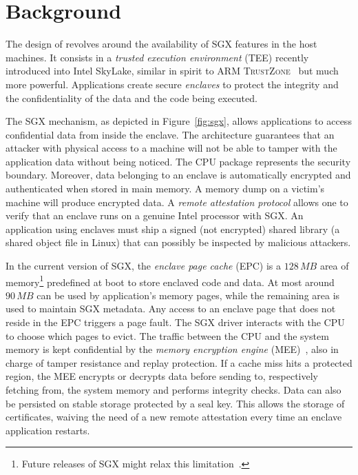 
\chapter{Background}
\label{chap:background}

The design of \SS{} revolves around the availability of SGX features in the host machines.
It consists in a \emph{trusted execution environment} (TEE) recently introduced into Intel{\textregistered} SkyLake, similar in spirit to ARM \textsc{TrustZone}~\cite{arm2009security} but much more powerful.
Applications create secure \emph{enclaves} to protect the integrity and the confidentiality of the data and the code being executed.

The SGX mechanism, as depicted in Figure~\ref{fig:sgx}, allows applications to access confidential data from inside the enclave.
The architecture guarantees that an attacker with physical access to a machine will not be able to tamper with the application data without being noticed.
The CPU package represents the security boundary.
Moreover, data belonging to an enclave is automatically encrypted and authenticated when stored in main memory.
A memory dump on a victim's machine will produce encrypted data.
A \emph{remote attestation protocol} allows one to verify that an enclave runs on a genuine Intel{\textregistered} processor with SGX.
An application using enclaves must ship a signed (not encrypted) shared library (a shared object file in Linux) that can possibly be inspected by malicious attackers.

In the current version of SGX, the \emph{enclave page cache} (EPC) is a $128\,\mathit{MB}$ area of memory\footnote{Future releases of SGX might relax this limitation~\cite{mckeen2016intel}.} predefined at boot to store enclaved code and data.
At most around $90\,\mathit{MB}$ can be used by application's memory pages, while the remaining area is used to maintain SGX metadata.
Any access to an enclave page that does not reside in the EPC triggers a page fault.
The SGX driver interacts with the CPU to choose which pages to evict.
The traffic between the CPU and the system memory is kept confidential by the \emph{memory encryption engine} (MEE)~\cite{gueron2016memory}, also in charge of tamper resistance and replay protection.
If a cache miss hits a protected region, the MEE encrypts or decrypts data before sending to, respectively fetching from, the system memory and performs integrity checks.
Data can also be persisted on stable storage protected by a seal key.
This allows the storage of certificates, waiving the need of a new remote attestation every time an enclave application restarts.

